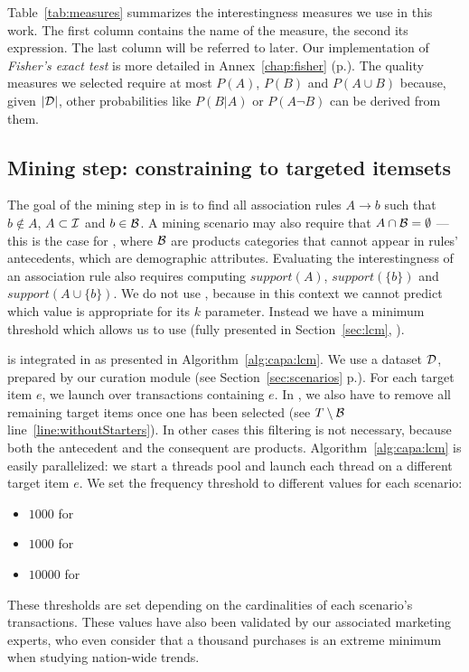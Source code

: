


Table~\ref{tab:measures} summarizes the interestingness measures we use in this work.
The first column contains the name of the measure, the second its expression.
The last column will be referred to later.
Our implementation of {\em Fisher's exact test} is more detailed in
Annex~\ref{chap:fisher} (p.\pageref{chap:fisher}).
The quality measures we selected require at most $P(A)$, $P(B)$ and $P(A \cup B)$ because,
given $|{\cal D}|$, other probabilities like $P(B|A)$ or $P(A \neg B)$ can be derived from them.




\subsection{Mining step: constraining \jlcm to targeted itemsets}
\label{sec:capa:mining}

The goal of the mining step in \capa is to find all association rules $A \rightarrow {b}$
such that $b \notin A$, $A \subset \cal I$ and $b \in \cal B$.
A mining scenario may also require that $A \cap {\cal B} = \emptyset$ --- this is the case for \demoassoc,
where $\cal B$ are products categories that cannot appear in rules' antecedents, which are demographic attributes.
Evaluating the interestingness of an association rule also requires computing
$\mathit{support}(A)$, $\mathit{support}(\{b\})$ and $\mathit{support}(A \cup \{b\})$.
We do not use \toppi,
because in this context we cannot predict which value is appropriate for its $k$ parameter.
Instead we have a minimum threshold which allows us to use \jlcm
(fully presented in Section~\ref{sec:lcm}, \pageref{sec:lcm}).



\jlcm is integrated in \capa as presented in Algorithm~\ref{alg:capa:lcm}.
We use a dataset $\cal D$, prepared by our curation module
(see Section~\ref{sec:scenarios} p.\pageref{sec:scenarios}).
For each target item $e$, we launch \jlcm over transactions containing $e$.
In \demoassoc, we also have to remove all remaining target items once
one has been selected (see $T \setminus {\cal B}$ line~\ref{line:withoutStarters}).
In other cases this filtering is not necessary,
because both the antecedent and the consequent are products.
Algorithm~\ref{alg:capa:lcm} is easily parallelized:
we start a \jlcm threads pool and launch each thread on a different target item $e$.
We set the frequency threshold to different values for each scenario:
\begin{itemize}
  \item $\num{1000}$ for \demoassoc
  \item $\num{1000}$ for \prodassocreceipt
  \item $\num{10000}$ for \prodassocclient
\end{itemize}
These thresholds are set depending on the cardinalities of each scenario's transactions.
These values have also been validated by our associated marketing experts,
who even consider that a thousand purchases is an extreme minimum when studying nation-wide trends.

